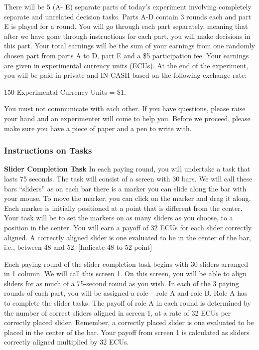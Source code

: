 There will be 5 (A- E) separate parts of today’s experiment involving completely separate and unrelated decision tasks.  Parts A-D contain 3 rounds each and part E is played for a round. You will go through each part separately, meaning that after we have gone through instructions for each part, you will make decisions in this part. Your total earnings will be the sum of your earnings from one randomly chosen part from parts A to D, part E and a \$5 participation fee.  Your earnings are given in experimental currency units (ECUs).  At the end of the experiment, you will be paid in private and IN CASH based on the following exchange rate:

150 Experimental Currency Units = \$1. 

You must not communicate with each other.  If you have questions, please raise your hand and an experimenter will come to help you. Before we proceed, please make sure you have a piece of paper and a pen to write with. 

\subsubsection{Instructions on Tasks}
\newline
\textbf{Slider Completion Task}
\newline
In each paying round, you will undertake a task that lasts 75 seconds.  The task will consist of a screen with 30 bars.  We will call these bars “sliders” as on each bar there is a marker you can slide along the bar with your mouse. To move the marker, you can click on the marker and drag it along. Each marker is initially positioned at a point that is different from the center.  Your task will be to set the markers on as many sliders as you choose, to a position in the center. You will earn a payoff of 32 ECUs for each slider correctly aligned. A correctly aligned slider is one evaluated to be in the center of the bar, i.e., between 48 and 52. [Indicate 48 to 52 point]

Each paying round of the slider completion task begins with 30 sliders arranged in 1 column. We will call this screen 1. On this screen, you will be able to align sliders for as much of a 75-second round as you wish. In each of the 3 paying rounds of each part, you will be assigned a role – role A and role B. Role A has to complete the slider tasks. The payoff of role A in each round is determined by the number of correct sliders aligned in screen 1, at a rate of 32 ECUs per correctly placed slider. Remember, a correctly placed slider is one evaluated to be placed in the center of the bar. Your payoff from screen 1 is calculated as sliders correctly aligned multiplied by 32 ECUs. 

